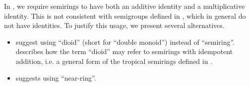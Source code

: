 \begin{remark}\label{rem:semiring_etymology}
  In , we require semirings to have both an additive identity and a multiplicative identity. This is not consistent with semigroups defined in , which in general do not have identities. To justify this usage, we present several alternatives.
  \begin{itemize}
    \item {} suggest using \enquote{dioid} (short for \enquote{double monoid}) instead of \enquote{semiring}.  describes how the term \enquote{dioid} may refer to semirings with idempotent addition, i.e. a general form of the tropical semirings defined in .

    \item {} suggests using \enquote{near-ring}.
  \end{itemize}

\end{remark}

